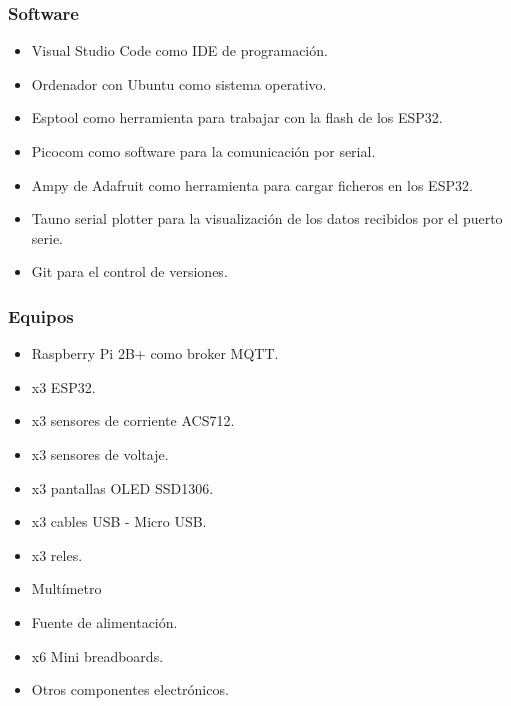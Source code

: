 \begin{titlepage}
\subsubsection{Software}
\begin{itemize}
	\item Visual Studio Code como IDE de programación.
	\item Ordenador con Ubuntu como sistema operativo.
	\item Esptool como herramienta para trabajar con la flash de los ESP32.
	\item Picocom como software para la comunicación por serial.
	\item Ampy de Adafruit como herramienta para cargar ficheros en los ESP32.
	\item Tauno serial plotter para la visualización de los datos recibidos por el puerto serie.
	\item Git para el control de versiones.
\end{itemize}

\subsubsection{Equipos}
\begin{itemize}
	\item Raspberry Pi 2B+ como broker MQTT.
	\item x3 ESP32.
	\item x3 sensores de corriente ACS712.
	\item x3 sensores de voltaje. 
	\item x3 pantallas OLED SSD1306.
	\item x3 cables USB - Micro USB.
	\item x3 reles.
	\item Multímetro
	\item Fuente de alimentación.
	\item x6 Mini breadboards.
	\item Otros componentes electrónicos.
\end{itemize}


\end{titlepage}
